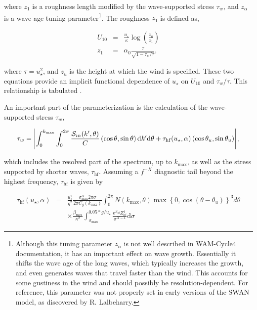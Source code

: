 \noindent
where $z_1$ is a roughness length modified by the wave-supported stress
$\tau_w$, and $z_\alpha$ is a wave age tuning parameter\footnote{Although this
tuning parameter $z_\alpha$ is not well described in WAM-Cycle4 documentation,
it has an important effect on wave growth. Essentially it shifts the wave age
of the long waves, which typically increases the growth, and even generates
waves that travel faster than the wind. This accounts for some gustiness in
the wind and should possibly be resolution-dependent. For reference, this
parameter was not properly set in early versions of the SWAN model, as
discovered by R. Lalbeharry.}.  The roughness $z_1$ is defined as,

\begin{eqnarray}
U_{10}&=&\frac{u_\star}{\kappa} \log\left(\frac{z_u}{z_1}\right) \\
z_1&=&\alpha_0 \frac{\tau}{ \sqrt{1-\tau_w/\tau}},
\end{eqnarray}

\noindent
where $\tau=u_\star^2$, and $z_u$ is the height at which the wind is
specified. These two equations provide an implicit functional dependence of
$u_\star$ on $U_{10}$ and $\tau_w/\tau$. This relationship is tabulated
\citep{art:Jan91, rep:Bea07}.

An important part of the parameterization is the calculation of the
wave-supported stress $\tau_w$,

\begin{equation}
\tau_w=\left|\int_0^{k_{\max}} \int_0^{2 \pi} \frac{{\cal S}_{in}(k',\theta)}{C}
\left(\cos \theta, \sin \theta \right)  {\mathrm d} k' \mathrm d \theta +
\tau_{\mathrm{hf}}(u_\star,\alpha) \left(\cos \theta_u, \sin \theta_u \right)
\right|,\label{eq:tauwint}
\end{equation}

\noindent
which includes the resolved part of the spectrum, up to $k_{\max}$, as well as
the stress supported by shorter waves, $\tau_{\mathrm{hf}}$. Assuming a
$f^{-X}$ diagnostic tail beyond the highest frequency, $\tau_{\mathrm{hf}}$ is
given by

\begin{eqnarray}
\tau_{\mathrm{hf}}(u_\star,\alpha)&= &\frac{u_{\star}^2}{g^2}
\frac{\sigma_{\max}^X 2 \pi \sigma }{2 \pi C_g(k_{\max})} \int_0^{2 \pi} N
\left(k_{\max},\theta \right)
\max\left\{0,\cos\left(\theta-\theta_u\right)\right\}^3 d \theta \nonumber \\
& & \times \frac{\beta_{\mathrm{max}}}{\kappa^2}
\int_{\sigma_{\max}}^{0.05*g/u_\star} \frac{{\mathrm
e}^{Z_{\mathrm{hf}}}Z_{\mathrm{hf}}^4}{\sigma^{X-4}} {\mathrm d} \sigma
\label{eq:tauhfint}
\end{eqnarray}

